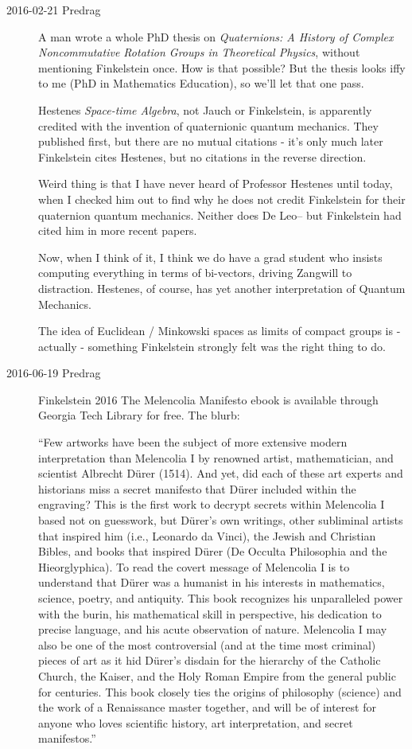 \begin{description}
\item[2016-02-21 Predrag]
A man wrote a whole PhD thesis
    on {\em Quaternions: A History of Complex Noncommutative Rotation
    Groups in Theoretical Physics}, without mentioning  Finkelstein
    \etal{} once. How is that possible? But the
    thesis looks iffy to me (PhD in Mathematics Education), so we'll
    let that one pass.

Hestenes {\em Space-time Algebra}, not Jauch or
Finkelstein, is apparently credited with the
invention of quaternionic quantum mechanics. They published first, but
there are no mutual citations - it's only much later Finkelstein cites
Hestenes, but no citations in the reverse direction.

Weird thing is that I have never heard of Professor Hestenes until
today, when I checked him out to find why he does not credit
Finkelstein \etal{} for their quaternion quantum
mechanics. Neither does De Leo-- but Finkelstein had cited
him in more recent papers.

Now, when I think of it, I think we do have a grad student who insists
computing everything in terms of bi-vectors, driving Zangwill to
distraction. Hestenes, of course, has yet another interpretation of
Quantum Mechanics.

The idea of Euclidean / Minkowski spaces as limits of compact groups is
- actually - something Finkelstein strongly felt was the right thing to
do.

\item[2016-06-19 Predrag]
Finkelstein 2016
{{The Melencolia Manifesto}} ebook is available through Georgia Tech Library
for free. The blurb:

``Few artworks have been the subject of more extensive modern
interpretation than Melencolia I by renowned artist, mathematician, and
scientist Albrecht Dürer (1514). And yet, did each of these art experts
and historians miss a secret manifesto that Dürer included within the
engraving? This is the first work to decrypt secrets within Melencolia I
based not on guesswork, but D\"urer’s own writings, other subliminal
artists that inspired him (i.e., Leonardo da Vinci), the Jewish and
Christian Bibles, and books that inspired D\"urer (De Occulta Philosophia
and the Hieorglyphica). To read the covert message of Melencolia I is to
understand that D\"urer was a humanist in his interests in mathematics,
science, poetry, and antiquity. This book recognizes his unparalleled
power with the burin, his mathematical skill in perspective, his
dedication to precise language, and his acute observation of nature.
Melencolia I may also be one of the most controversial (and at the time
most criminal) pieces of art as it hid D\"urer’s disdain for the hierarchy
of the Catholic Church, the Kaiser, and the Holy Roman Empire from the
general public for centuries. This book closely ties the origins of
philosophy (science) and the work of a Renaissance master together, and
will be of interest for anyone who loves scientific history, art
interpretation, and secret manifestos.''


\end{description}
